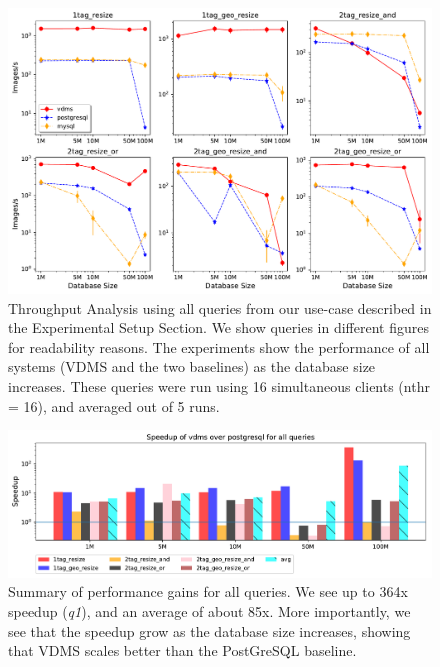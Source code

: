 \begin{figure}[ht!]
\includegraphics[width=\columnwidth]{figures/plot_th_16_mosaic_results_throughput}
\caption{Throughput Analysis using all queries from our use-case
described in the Experimental Setup Section.
We show queries in different figures for readability reasons.
The experiments show the performance of all systems (VDMS and the two baselines) as the
database size increases.
These queries were run using 16 simultaneous clients (nthr = 16),
and averaged out of 5 runs.}
\label{fig:q_throughput_16}
\end{figure}




\begin{figure}[ht!]
\centering
\includegraphics[width=\textwidth]{figures/plot_th_56_query_times_speedup_postgresql}
\caption{Summary of performance gains for all queries.
We see up to 364x speedup (\textit{q1}), and an average of about 85x.
More importantly, we see that the speedup grow as the database size increases,
showing that VDMS scales better than the PostGreSQL baseline.}
\label{fig:summary_postgresql}
\end{figure}


